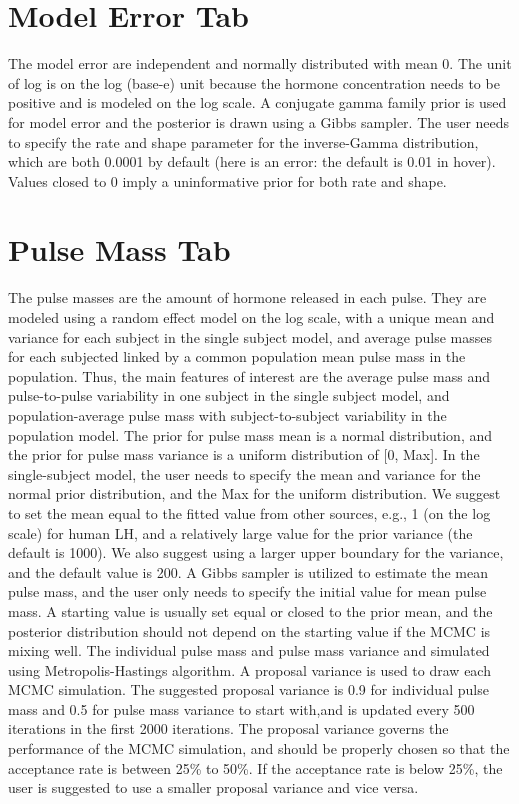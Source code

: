 \documentclass[11pt]{book}
\begin{document}
\section{Model Error Tab}
The model error are independent and normally distributed with mean 0. The unit of log is on the log (base-e) unit because the hormone concentration needs to be positive and is modeled on the log scale. A conjugate gamma family prior is used for model error and the posterior is drawn using a Gibbs sampler. The user needs to specify the rate and shape parameter for the inverse-Gamma distribution, which are both 0.0001 by default (here is an error: the default is 0.01 in hover). Values closed to 0 imply a uninformative prior for both rate and shape.
\section{Pulse Mass Tab}
The pulse masses are the amount of hormone released in each pulse. They are modeled using a random effect model on the log scale, with a unique mean and variance for each subject in the single subject model, and average pulse masses for each subjected linked by a common population mean pulse mass in the population. Thus, the main features of interest are the average pulse mass and pulse-to-pulse variability in one subject in the single subject model, and population-average pulse mass with subject-to-subject variability in the population model. The prior for pulse mass mean is a normal distribution, and the prior for pulse mass variance is a uniform distribution of [0, Max]. In the single-subject model, the user needs to specify the mean and variance for the normal prior distribution, and the Max for the uniform distribution. We suggest to set the mean equal to the fitted value from other sources, e.g., 1 (on the log scale) for human LH, and a relatively large value for the prior variance (the default is 1000). We also suggest using a larger upper boundary for the variance, and the default value is 200. A Gibbs sampler is utilized to estimate the mean pulse mass, and the user only needs to specify the initial value for mean pulse mass.  A starting value is usually set equal or closed to the prior mean, and the posterior distribution should not depend on the starting value if the MCMC is mixing well. The individual pulse mass and pulse mass variance and simulated using Metropolis-Hastings algorithm. A proposal variance is used to draw each MCMC simulation. The suggested proposal variance  is 0.9 for individual pulse mass and 0.5 for pulse mass variance to start with,and is updated every 500 iterations in the first 2000 iterations. The proposal variance governs the performance of the MCMC simulation, and should be properly chosen so that the acceptance rate is between 25\% to 50\%. If the acceptance rate is below 25\%, the user is suggested to use a smaller proposal variance and vice versa.
\end{document}
